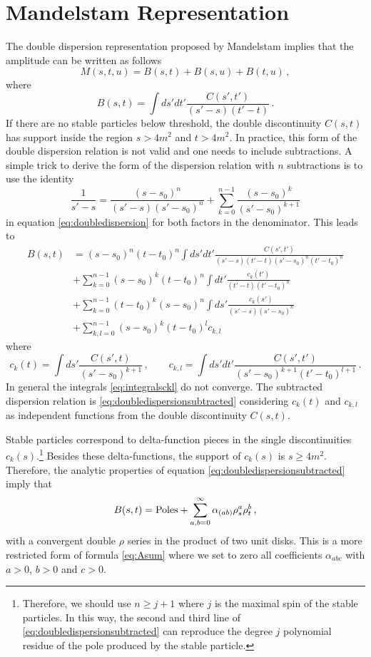 \documentclass[12pt]{article}
\newcommand{\begBvR}[1]{\begin{#1}}
\newcommand{\beq}{\begBvR{equation}}
\newcommand{\eeq}{\end{equation}}
\newcommand{\la}[1]{\label{#1}}
\newcommand{\<}{{\langle}}
\renewcommand{\>}{{\rangle}}
\begin{document}
\section{Mandelstam Representation}\la{Man}


The double dispersion representation proposed by Mandelstam \cite{Mandelstam:1959bc} implies that the amplitude can be written as follows
\beq
M(s,t,u)=B(s,t)+B(s,u)+B(t,u)\,,
\eeq
where 
\beq
B(s,t)=\int ds' dt'\frac{C(s',t')}{(s'-s)(t'-t)}\, .
\label{eq:doubledispersion}
\eeq
If there are no stable particles below threshold, the double discontinuity $C(s,t)$ has support inside the region   $s>4m^2$ and $t>4m^2$. In practice, this form of the double dispersion relation is not valid and one needs to include subtractions. A simple trick to derive the form of the dispersion relation with $n$ subtractions is to use the identity
\beq
\frac{1}{s'-s}=\frac{(s-s_0)^n}{(s'-s)(s'-s_0)^n}+\sum_{k=0}^{n-1}
\frac{(s-s_0)^{k}}{(s'-s_0)^{k+1}}
\eeq
in equation \eqref{eq:doubledispersion} for both factors in the denominator.
This leads to 
\begin{align}
B(s,t)&=(s-s_0)^n(t-t_0)^n\int ds' dt'\frac{C(s',t')}{(s'-s)(t'-t)(s'-s_0)^n(t'-t_0)^n}
\nonumber  \\
&+\sum_{k=0}^{n-1} 
 (s-s_0)^{k} (t-t_0)^n
 \int  dt'\frac{c_k(t')}{ (t'-t) (t'-t_0)^n} \label{eq:doubledispersionsubtracted}\\
&+\sum_{k=0}^{n-1} 
 (t-t_0)^{k} (s-s_0)^n
 \int  ds'\frac{c_k(s')}{ (s'-s) (s'-s_0)^n}  \nonumber \\
&+\sum_{k,l=0}^{n-1} 
 (s-s_0)^k(t-t_0)^{l}  c_{k,l}  \nonumber
\end{align}
where
\beq
c_k(t)=\int ds'\frac{C(s',t)}{(s'-s_0)^{k+1}}\,,\qquad
c_{k,l}=\int ds'dt'\frac{C(s',t')}{(s'-s_0)^{k+1}(t'-t_0)^{l+1}}\,.
\label{eq:integralsckl}
\eeq
In general the integrals \eqref{eq:integralsckl} do not converge. 
The subtracted dispersion relation is \eqref{eq:doubledispersionsubtracted} considering $c_k(t)$ and $c_{k,l}$ as independent functions from the double discontinuity $C(s,t)$.

Stable particles correspond to delta-function pieces in the single discontinuities $c_k(s)$.\footnote{Therefore, we should use $n\ge j+1$ where $j$ is the maximal spin of the stable particles. In this way, the second and third line of \eqref{eq:doubledispersionsubtracted} can reproduce the degree $j$ polynomial residue of the pole produced by the stable particle.}
Besides these delta-functions, the support of $c_k(s)$ is $s\ge 4m^2$. Therefore, the analytic properties of equation \eqref{eq:doubledispersionsubtracted} imply that 
\beq
B(s,t)={\rm Poles}+\sum_{a,b=0}^\infty \alpha_{(ab)} \rho_s^a \rho_t^b\,,
\eeq
with a convergent double $\rho$ series in the product of two unit disks. This is a more restricted form of formula \eqref{eq:Asum} where we set to zero all coefficients $\alpha_{abc}$ with $a>0$, $b>0$ and $c>0$.
\end{document}
